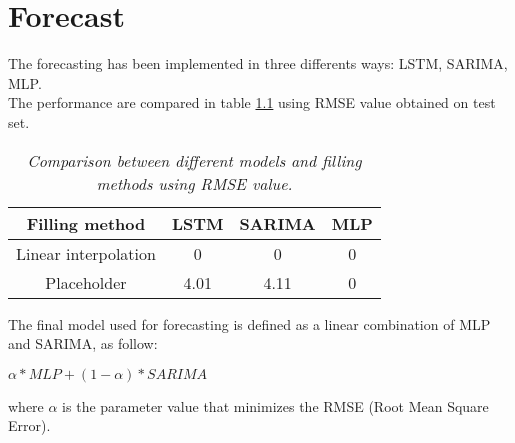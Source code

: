\chapter {Forecast}

The forecasting has been implemented in three differents ways: LSTM, SARIMA, MLP.
\\
The performance are compared in table \ref{table:RMSE} using RMSE value obtained on test set.

\begin{center}
\begin{table}
 \begin{tabular}{|c|c|c|c|} 
 \hline
 Filling method & LSTM & SARIMA & MLP \\
 \hline \hline
 Linear interpolation & 0 & 0 & 0 \\
 Placeholder & 4.01 & 4.11 & 0 \\
 \hline
 \end{tabular}
 \caption{\textit{Comparison between different models and filling methods using RMSE value.}}
 \label{table:RMSE}
\end{table}
\end{center}


The final model used for forecasting is defined as a linear combination of MLP and SARIMA, as follow:
\\
\begin{center}
  $\alpha * MLP + (1 - \alpha) * SARIMA$
\end{center}
where $\alpha$ is the parameter value that minimizes the RMSE (Root Mean Square Error).


